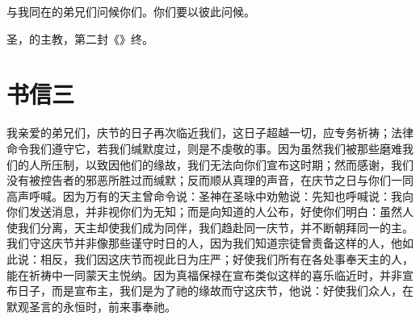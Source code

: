 与我同在的弟兄们问候你们。你们要以彼此问候。\par

圣，的主教，第二封《》终。\par



\section{书信三}

\par

我亲爱的弟兄们，庆节的日子再次临近我们，这日子超越一切，应专务祈祷；法律命令我们遵守它，若我们缄默度过，则是不虔敬的事。因为虽然我们被那些磨难我们的人所压制，以致因他们的缘故，我们无法向你们宣布这时期；然而感谢，我们没有被控告者的邪恶所胜过而缄默；反而顺从真理的声音，在庆节之日与你们一同高声呼喊。因为万有的天主曾命令说：圣神在圣咏中劝勉说：先知也呼喊说：我向你们发送消息，并非视你们为无知；而是向知道的人公布，好使你们明白：虽然人使我们分离，天主却使我们成为同伴，我们趋赴同一庆节，并不断朝拜同一的主。我们守这庆节并非像那些谨守时日的人，因为我们知道宗徒曾责备这样的人，他如此说：相反，我们因这庆节而视此日为庄严；好使我们所有在各处事奉天主的人，能在祈祷中一同蒙天主悦纳。因为真福保禄在宣布类似这样的喜乐临近时，并非宣布日子，而是宣布主，我们是为了祂的缘故而守这庆节，他说：好使我们众人，在默观圣言的永恒时，前来事奉祂。\par

